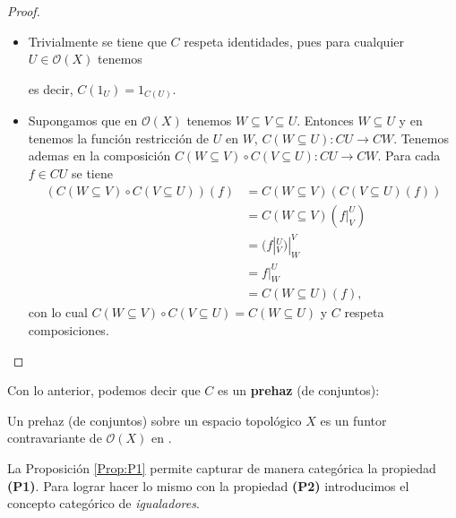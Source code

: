 \begin{proof}
   \begin{itemize}
      \item Trivialmente se tiene que $C$ respeta identidades, pues para cualquier $U\in\mathcal{O}(X)$ tenemos
         
         es decir, $C(1_U)=1_{C(U)}$.
      \item Supongamos que en $\mathcal{O}(X)$ tenemos $W\subseteq V\subseteq U$. Entonces $W\subseteq U$ y en  tenemos la función restricción de $U$ en $W$, $C(W\subseteq U):CU\to CW$. Tenemos ademas en  la composición $C(W\subseteq V)\circ C(V\subseteq U):CU\to CW$. Para cada $f\in CU$ se tiene
         $$
         \begin{aligned}
            (C(W\subseteq V)\circ C(V\subseteq U))(f)&=C(W\subseteq V)(C(V\subseteq U)(f))\\
                                                     &=C(W\subseteq V)(f|^U_V)\\
                                                     &=(f|^U_V)|^V_W\\
                                                     &=f|^U_W\\
                                                     &=C(W\subseteq U)(f),
         \end{aligned}
         $$
      con lo cual $C(W\subseteq V)\circ C(V\subseteq U) = C(W\subseteq U)$ y $C$ respeta composiciones.
      \end{itemize}
\end{proof}
Con lo anterior, podemos decir que $C$ es un \textbf{prehaz} (de conjuntos):
\begin{Def}[Prehaz]
   Un prehaz (de conjuntos) sobre un espacio topológico $X$ es un funtor contravariante de $\mathcal{O}(X)$ en .
\end{Def}
La Proposición \ref{Prop:P1} permite capturar de manera categórica la propiedad \textbf{(P1)}. Para lograr hacer lo mismo con la propiedad \textbf{(P2)} introducimos el concepto categórico de \textit{igualadores}.
